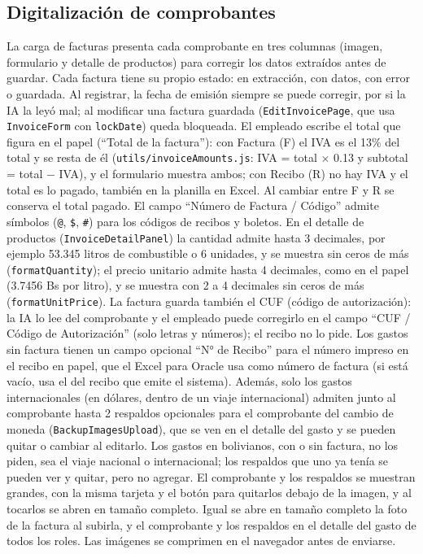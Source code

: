 \documentclass[11pt,letterpaper]{article}
\newcommand{\code}[1]{\nolinkurl{#1}}
\begin{document}
\subsection{Digitalización de comprobantes}
La carga de facturas presenta cada comprobante en tres columnas (imagen, formulario y detalle de productos) para corregir los datos extraídos antes de guardar. Cada factura tiene su propio estado: en extracción, con datos, con error o guardada. Al registrar, la fecha de emisión siempre se puede corregir, por si la IA la leyó mal; al modificar una factura guardada (\code{EditInvoicePage}, que usa \code{InvoiceForm} con \code{lockDate}) queda bloqueada. El empleado escribe el total que figura en el papel (``Total de la factura''): con Factura (F) el IVA es el 13\% del total y se resta de él (\code{utils/invoiceAmounts.js}: IVA = total $\times$ 0.13 y subtotal = total $-$ IVA), y el formulario muestra ambos; con Recibo (R) no hay IVA y el total es lo pagado, también en la planilla en Excel. Al cambiar entre F y R se conserva el total pagado. El campo ``Número de Factura / Código'' admite símbolos (\code{@}, \code{\$}, \code{\#}) para los códigos de recibos y boletos. En el detalle de productos (\code{InvoiceDetailPanel}) la cantidad admite hasta 3 decimales, por ejemplo 53.345 litros de combustible o 6 unidades, y se muestra sin ceros de más (\code{formatQuantity}); el precio unitario admite hasta 4 decimales, como en el papel (3.7456 Bs por litro), y se muestra con 2 a 4 decimales sin ceros de más (\code{formatUnitPrice}). La factura guarda también el CUF (código de autorización): la IA lo lee del comprobante y el empleado puede corregirlo en el campo ``CUF / Código de Autorización'' (solo letras y números); el recibo no lo pide. Los gastos sin factura tienen un campo opcional ``N° de Recibo'' para el número impreso en el recibo en papel, que el Excel para Oracle usa como número de factura (si está vacío, usa el del recibo que emite el sistema). Además, solo los gastos internacionales (en dólares, dentro de un viaje internacional) admiten junto al comprobante hasta 2 respaldos opcionales para el comprobante del cambio de moneda (\code{BackupImagesUpload}), que se ven en el detalle del gasto y se pueden quitar o cambiar al editarlo. Los gastos en bolivianos, con o sin factura, no los piden, sea el viaje nacional o internacional; los respaldos que uno ya tenía se pueden ver y quitar, pero no agregar. El comprobante y los respaldos se muestran grandes, con la misma tarjeta y el botón para quitarlos debajo de la imagen, y al tocarlos se abren en tamaño completo. Igual se abre en tamaño completo la foto de la factura al subirla, y el comprobante y los respaldos en el detalle del gasto de todos los roles. Las imágenes se comprimen en el navegador antes de enviarse.
\end{document}
